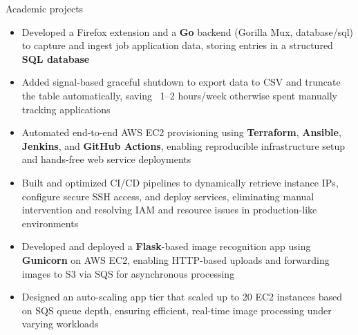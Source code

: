 \documentclass{resume}
\begin{document}
\begin{experienceSection}{Academic projects}

        \projectItem[
        title=JobTrail - Go based job tracking,
        duration={Jun 2024 - Present},
    ]
    \begin{itemize}
        \vspace{-0.5em}
        \itemsep -6pt {}
        \item Developed a Firefox extension and a \textbf{Go} backend (Gorilla Mux, database/sql) to capture and ingest job application data, storing entries in a structured \textbf{SQL database}
        \item Added signal-based graceful shutdown to export data to CSV and truncate the table automatically, saving ~1–2 hours/week otherwise spent manually tracking applications   
    \end{itemize}

    \projectItem[
        title={End-to-End Deployment Automation},
        duration={Mar 2025 - Apr 2025},
    ]
    \begin{itemize}
        \vspace{-0.5em}
        \itemsep -6pt {}
        \item Automated end-to-end AWS EC2 provisioning using \textbf{Terraform}, \textbf{Ansible}, \textbf{Jenkins}, and \textbf{GitHub Actions}, enabling reproducible infrastructure setup and hands-free web service deployments
        \item Built and optimized CI/CD pipelines to dynamically retrieve instance IPs, configure secure SSH access, and deploy services, eliminating manual intervention and resolving IAM and resource issues in production-like environments
    \end{itemize}

    \projectItem[
        title=AWS-Based Face Recognition App,
        duration={Feb 2024 - May 2024},
    ]
    \begin{itemize}
        \vspace{-0.5em}
        \itemsep -6pt {}
        \item Developed and deployed a \textbf{Flask}-based image recognition app using \textbf{Gunicorn} on AWS EC2, enabling HTTP-based uploads and forwarding images to S3 via SQS for asynchronous processing
        \item Designed an auto-scaling app tier that scaled up to 20 EC2 instances based on SQS queue depth, ensuring efficient, real-time image processing under varying workloads
    \end{itemize}
    
\end{experienceSection}
\end{document}
